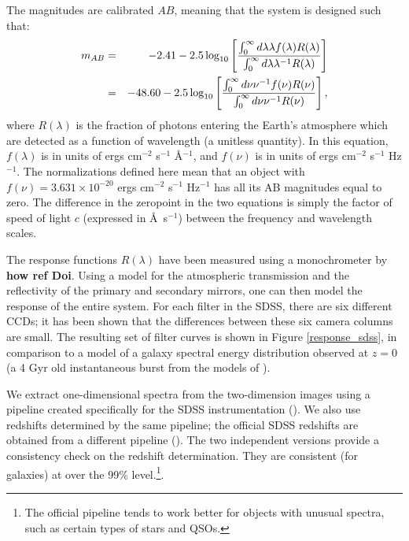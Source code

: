 \documentclass[10pt,preprint]{aastex}
\begin{document}
The magnitudes are calibrated $AB$, meaning that the system is
designed such that:
\begin{eqnarray}
m_{AB} &=& -2.41 - 2.5 \log_{10}\left[
\frac{\int_{0}^{\infty} d\lambda \lambda f(\lambda) R(\lambda)}
{\int_{0}^{\infty} d\lambda \lambda^{-1} R(\lambda)}\right]
\cr
&=& -48.60 - 2.5 \log_{10}\left[
\frac{\int_{0}^{\infty} d\nu \nu^{-1} f(\nu) R(\nu)}
{\int_{0}^{\infty} d\nu \nu^{-1} R(\nu)}\right],
\cr
\end{eqnarray}
where $R(\lambda)$ is the fraction of photons entering the Earth's
atmosphere which are detected as a function of wavelength (a unitless
quantity). In this equation, $f(\lambda)$ is in units of ergs
cm$^{-2}$ s$^{-1}$ \AA$^{-1}$, and $f(\nu)$ is in units of ergs
cm$^{-2}$ s$^{-1}$ Hz$^{-1}$. The normalizations defined here mean
that an object with $f(\nu) = 3.631 \times 10^{-20}$ ergs cm$^{-2}$
s$^{-1}$ Hz$^{-1}$ has all its AB magnitudes equal to zero.  The
difference in the zeropoint in the two equations is simply the factor
of speed of light $c$ (expressed in \AA\ s$^{-1}$) between the
frequency and wavelength scales.

The response functions $R(\lambda)$ have been measured using a
monochrometer by {\bf how ref Doi}.  Using a model for the atmospheric
transmission and the reflectivity of the primary and secondary
mirrors, one can then model the response of the entire system. For
each filter in the SDSS, there are six different CCDs; it has been
shown that the differences between these six camera columns are
small. The resulting set of filter curves is shown in Figure
\ref{response_sdss}, in comparison to a model of a galaxy spectral
energy distribution observed at $z=0$ (a 4 Gyr old instantaneous burst
from the models of \citealt{bruzual93a}).

We extract one-dimensional spectra from the two-dimension images using
a pipeline created specifically for the SDSS instrumentation
(\citealt{schlegel02a}). We also use redshifts determined by the same
pipeline; the official SDSS redshifts are obtained from a different
pipeline (\citealt{subbarao02a}). The two independent versions provide
a consistency check on the redshift determination. They are consistent
(for galaxies) at over the 99\% level.\footnote{The official pipeline
tends to work better for objects with unusual spectra, such as certain
types of stars and QSOs.}.
\end{document}
